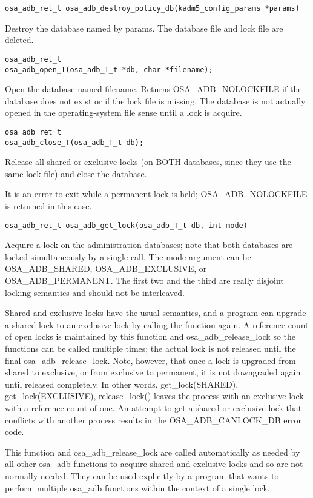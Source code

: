 \begin{verbatim}
osa_adb_ret_t osa_adb_destroy_policy_db(kadm5_config_params *params)
\end{verbatim}
%
Destroy the database named by params.  The database file and lock file
are deleted.

\begin{verbatim}
osa_adb_ret_t
osa_adb_open_T(osa_adb_T_t *db, char *filename);
\end{verbatim}
%
Open the database named filename.  Returns OSA_ADB_NOLOCKFILE if the
database does not exist or if the lock file is missing.  The database
is not actually opened in the operating-system file sense until a lock
is acquire.

\begin{verbatim}
osa_adb_ret_t
osa_adb_close_T(osa_adb_T_t db);
\end{verbatim}
%
Release all shared or exclusive locks (on BOTH databases, since they
use the same lock file) and close the database.

It is an error to exit while a permanent lock is held;
OSA_ADB_NOLOCKFILE is returned in this case.

\begin{verbatim}
osa_adb_ret_t osa_adb_get_lock(osa_adb_T_t db, int mode)
\end{verbatim}

Acquire a lock on the administration databases; note that both
databases are locked simultaneously by a single call.  The mode
argument can be OSA_ADB_SHARED, OSA_ADB_EXCLUSIVE, or
OSA_ADB_PERMANENT.  The first two and the third are really disjoint
locking semantics and should not be interleaved.

Shared and exclusive locks have the usual semantics, and a program can
upgrade a shared lock to an exclusive lock by calling the function
again.  A reference count of open locks is maintained by this function
and osa_adb_release_lock so the functions can be called multiple
times; the actual lock is not released until the final
osa_adb_release_lock.  Note, however, that once a lock is upgraded
from shared to exclusive, or from exclusive to permanent, it is not
downgraded again until released completely.  In other words,
get_lock(SHARED), get_lock(EXCLUSIVE), release_lock() leaves the
process with an exclusive lock with a reference count of one.  An
attempt to get a shared or exclusive lock that conflicts with another
process results in the OSA_ADB_CANLOCK_DB error code.

This function and osa_adb_release_lock are called automatically as
needed by all other osa_adb functions to acquire shared and exclusive
locks and so are not normally needed.  They can be used explicitly by
a program that wants to perform multiple osa_adb functions within the
context of a single lock.

